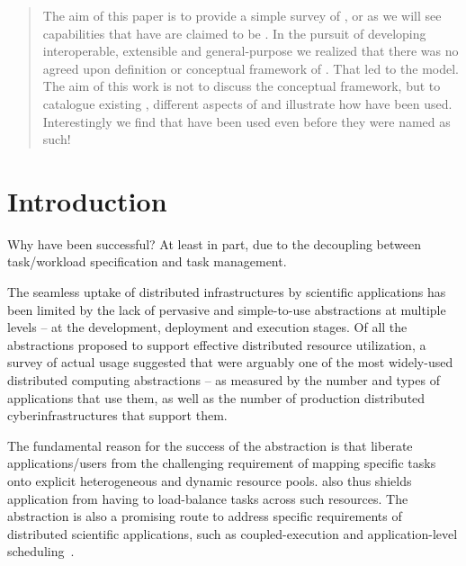 \documentclass{sig-alternate}
\begin{document}
\date{}
\maketitle

\begin{abstract} 
 The aim of this paper is to provide a simple survey of \pilotjobs, or
 as we will see capabilities that have are claimed to be \pilotjobs.
 In the pursuit of developing interoperable, extensible and
 general-purpose \pilotjobs we realized that there was no agreed upon
 definition or conceptual framework of \pilotjobs. That led to the
 \pstar model. The aim of this work is not to discuss the \pstar
 conceptual framework, but to catalogue existing \pilotjobs, different
 aspects of \pilotjobs and illustrate how \pilotjobs have been used.
 Interestingly we find that \pilotjobs have been used even before they
 were named as such!

\end{abstract}

\section{Introduction} 

Why have \pilotjobs been successful? At least in part, due to the
decoupling between task/workload specification and task management.

The seamless uptake of distributed infrastructures by scientific
applications has been limited by the lack of pervasive and
simple-to-use abstractions at multiple levels – at the development,
deployment and execution stages. Of all the abstractions proposed to
support effective distributed resource utilization, a survey of actual
usage suggested that \pilotjobs were arguably one of the most
widely-used distributed computing abstractions – as measured by the
number and types of applications that use them, as well as the number
of production distributed cyberinfrastructures that support them.  

 The fundamental
reason for the success of the \pilotjob abstraction is that \pilotjob
liberate applications/users from the challenging requirement of
mapping specific tasks onto explicit heterogeneous and dynamic
resource pools. \pilotjobs also thus shields application from having
to load-balance tasks across such resources.  The \pilotjob
abstraction is also a promising route to address specific requirements
of distributed scientific applications, such as coupled-execution and
application-level
scheduling~\cite{ko-efficient,DBLP:conf/hpdc/KimHMAJ10}.
\end{document}
